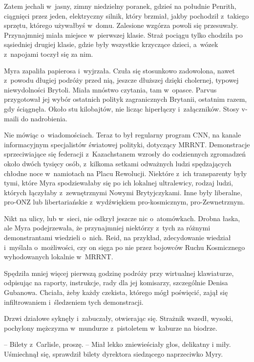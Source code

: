 \documentclass[oneside,polish,11pt,sfheadings]{mwbk}
\begin{document}
Zatem jechali w~jasny, zimny niedzielny poranek, gdzieś na południe
Penrith, ciągnięci przez jeden, elektryczny silnik, który brzmiał, jakby
pochodził z~takiego sprzętu, którego używałbyś w~domu. Zalesione wzgórza
powoli się przesuwały. Przynajmniej miała miejsce w~pierwszej klasie. Straż
pociągu tylko chodziła po sąsiedniej drugiej klasie, gdzie były wszystkie
krzyczące dzieci, a~wózek z~napojami toczył się za nim.

Myra zapaliła papierosa i~wyjrzała. Czuła się stosunkowo zadowolona,
nawet z~powodu długiej podróży przed nią, jeszcze dłuższej dzięki
cholernej, typowej niewydolności Brytoli. Miała mnóstwo czytania, tam w~opasce. Parvus przygotował jej wybór ostatnich polityk zagranicznych
Brytanii, ostatnim razem, gdy ściągnęła. Około stu kilobajtów, nie
licząc hiperłączy i~załączników. Stosy v-maili do nadrobienia.

Nie mówiąc o~wiadomościach. Teraz to był regularny program CNN, na
kanale informacyjnym specjalistów światowej polityki, dotyczący MRRNT.
Demonstracje sprzeciwiające się federacji z~Kazachstanem wzrosły do
codziennych zgromadzeń około dwóch tysięcy osób, z~kilkoma setkami
odważnych ludzi spędzających chłodne noce w~namiotach na Placu
Rewolucji. Niektóre z~ich transparenty były tymi, które Myra
spodziewałaby się po ich lokalnej ultralewicy, rodzaj ludzi, których
łączyłaby z~zewnętrznymi Nowymi Brytyjczykami. Inne były liberalne,
pro-ONZ lub libertariańskie z~wydźwiękiem pro-kosmicznym,
pro-Zewnetrznym.

Nikt na ulicy, lub w~sieci, nie odkrył jeszcze nic o~atomówkach. Drobna
łaska, ale Myra podejrzewała, że przynajmniej niektórzy z~tych za
różnymi demonstrantami wiedzieli o~nich. Reid, na przykład, zdecydowanie
wiedział i~myślała o~możliwości, czy on sięga po nie przez bojowców Ruchu
Kosmicznego wyhodowanych lokalnie w~MRRNT.

Spędziła mniej więcej pierwszą godzinę podróży przy wirtualnej
klawiaturze, odpisując na raporty, instrukcje, rady dla jej komisarzy,
szczególnie Denisa Gubanowa. Chciała, żeby każdy czekista, którego mógł
poświęcić, zajął się infiltrowaniem i~śledzeniem tych demonstracji.

Drzwi działowe syknęły i~zabuczały, otwierając się. Strażnik wszedł,
wysoki, pochylony mężczyzna w~mundurze z~pistoletem w~kaburze na
biodrze.

-- Bilety z~Carlisle, proszę. -- Miał lekko zniewieściały głos, delikatny
i miły. Uśmiechnął się, sprawdził bilety dyrektora siedzącego
naprzeciwko Myry.
\end{document}
